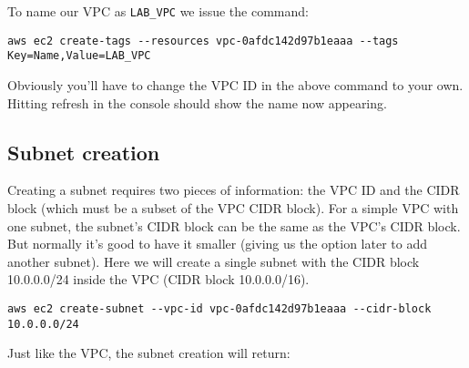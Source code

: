 To name our VPC as \texttt{LAB\_VPC} we issue the command:

\begin{verbatim}
aws ec2 create-tags --resources vpc-0afdc142d97b1eaaa --tags Key=Name,Value=LAB_VPC
\end{verbatim}

Obviously you'll have to change the VPC ID in the above command to your
own. Hitting refresh in the console should show the name now appearing.

\subsection{Subnet creation}\label{subnet-creation}

Creating a subnet requires two pieces of information: the VPC ID and the
CIDR block (which must be a subset of the VPC CIDR block). For a simple
VPC with one subnet, the subnet's CIDR block can be the same as the
VPC's CIDR block. But normally it's good to have it smaller (giving us
the option later to add another subnet). Here we will create a single
subnet with the CIDR block 10.0.0.0/24 inside the VPC (CIDR block
10.0.0.0/16).

\begin{verbatim}
aws ec2 create-subnet --vpc-id vpc-0afdc142d97b1eaaa --cidr-block 10.0.0.0/24
\end{verbatim}

Just like the VPC, the subnet creation will return:

\begin{Shaded}
\begin{Highlighting}[]
\FunctionTok{\{}
    \FunctionTok{:} \FunctionTok{\{}
        \FunctionTok{:} \FunctionTok{,}
        \FunctionTok{:} \FunctionTok{,}
        \FunctionTok{:} \FunctionTok{,}
        \FunctionTok{:} \FunctionTok{,}
        \FunctionTok{:} \FunctionTok{,}
        \FunctionTok{:} \FunctionTok{,}
        \FunctionTok{:} \FunctionTok{,}
        \FunctionTok{:} \FunctionTok{,}
        \FunctionTok{:} \FunctionTok{,}
        \FunctionTok{:} \FunctionTok{,}
        \FunctionTok{:} \FunctionTok{,}
        \FunctionTok{:} \OtherTok{[]}\FunctionTok{,}
        \FunctionTok{:} 
    \FunctionTok{\}}
\FunctionTok{\}}
\end{Highlighting}
\end{Shaded}

